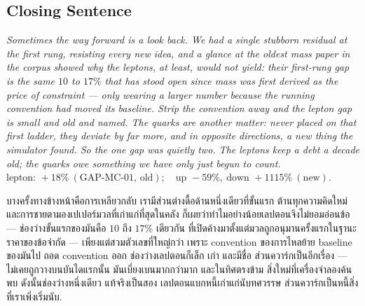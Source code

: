 \documentclass[12pt, a4paper]{article}
\begin{document}
\subsection{Closing Sentence}

\bigskip
\begin{center}
\textit{%
Sometimes the way forward is a look back. We had a single stubborn residual at
the first rung, resisting every new idea, and a glance at the oldest mass paper in
the corpus showed why the leptons, at least, would not yield: their first-rung
gap is the same $10$ to $17\%$ that has stood open since mass was first derived as
the price of constraint --- only wearing a larger number because the running
convention had moved its baseline. Strip the convention away and the lepton gap
is small and old and named. The quarks are another matter: never placed on that
first ladder, they deviate by far more, and in opposite directions, a new thing
the simulator found. So the one gap was quietly two. The leptons keep a debt a
decade old; the quarks owe something we have only just begun to count.}\\[0.5em]
$\displaystyle
  \text{lepton: }+18\%\ (\text{GAP-MC-01, old});\quad
  \text{up }{-}59\%,\ \text{down }{+}1115\%\ (\text{new}).$

\medskip
{\thaifont
บางครั้งทางข้างหน้าคือการเหลียวกลับ
เรามีส่วนต่างดื้อด้านหนึ่งเดียวที่ขั้นแรก ต้านทุกความคิดใหม่
และการชายตามองเปเปอร์มวลที่เก่าแก่ที่สุดในคลัง ก็เผยว่าทำไมอย่างน้อยเลปตอนจึงไม่ยอมอ่อนข้อ ---
ช่องว่างขั้นแรกของมันคือ $10$ ถึง $17\%$ เดียวกัน ที่เปิดค้างมาตั้งแต่มวลถูกอนุมานครั้งแรกในฐานะราคาของข้อจำกัด ---
เพียงแต่สวมตัวเลขที่ใหญ่กว่า เพราะ convention ของการไหลย้าย baseline ของมันไป
ถอด convention ออก ช่องว่างเลปตอนก็เล็ก เก่า และมีชื่อ
ส่วนควาร์กเป็นอีกเรื่อง --- ไม่เคยถูกวางบนบันไดแรกนั้น มันเบี่ยงเบนมากกว่ามาก และในทิศตรงข้าม สิ่งใหม่ที่เครื่องจำลองค้นพบ
ดังนั้นช่องว่างหนึ่งเดียว แท้จริงเป็นสอง
เลปตอนแบกหนี้เก่าแก่นับทศวรรษ ส่วนควาร์กเป็นหนี้สิ่งที่เราเพิ่งเริ่มนับ.}
\end{center}

\end{document}
